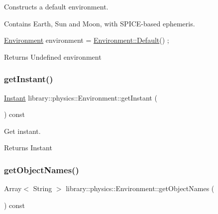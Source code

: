 Constructs a default environment. 

Contains Earth, Sun and Moon, with S\+P\+I\+C\+E-\/based ephemeris.


\begin{DoxyCode}
\hyperlink{classlibrary_1_1physics_1_1_environment_a51854f130c31eb075ea623e332978495}{Environment} environment = \hyperlink{classlibrary_1_1physics_1_1_environment_a7fcc57999bfb9c0c7e70b7cc783e30c8}{Environment::Default}() ;
\end{DoxyCode}


\begin{DoxyReturn}{Returns}
Undefined environment 
\end{DoxyReturn}
\mbox{\label{classlibrary_1_1physics_1_1_environment_a551ca61eb2aebd762e67b7c9e561d22e}} 
\subsubsection{\texorpdfstring{get\+Instant()}{getInstant()}}
{\footnotesize\ttfamily \hyperlink{classlibrary_1_1physics_1_1time_1_1_instant}{Instant} library\+::physics\+::\+Environment\+::get\+Instant (\begin{DoxyParamCaption}{ }\end{DoxyParamCaption}) const}



Get instant. 

\begin{DoxyReturn}{Returns}
Instant 
\end{DoxyReturn}
\mbox{\label{classlibrary_1_1physics_1_1_environment_ad90a5d1e67d62009e7cf6875c4fa7907}} 
\subsubsection{\texorpdfstring{get\+Object\+Names()}{getObjectNames()}}
{\footnotesize\ttfamily Array$<$ String $>$ library\+::physics\+::\+Environment\+::get\+Object\+Names (\begin{DoxyParamCaption}{ }\end{DoxyParamCaption}) const}



